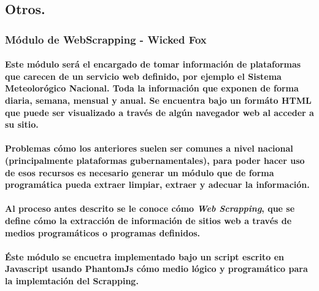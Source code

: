   \subsection{Otros.}
    \subsubsection{Módulo de WebScrapping - Wicked Fox}
    \paragraph{Este módulo será el encargado de tomar información de plataformas que carecen de un servicio web definido, por ejemplo el Sistema Meteolorógico Nacional. Toda la información que exponen de forma diaria, semana, mensual y anual. Se encuentra bajo un formáto HTML que puede ser visualizado a través de algún navegador web al acceder a su sitio.}
    \paragraph{Problemas cómo los anteriores suelen ser comunes a nivel nacional (principalmente plataformas gubernamentales), para poder hacer uso de esos recursos es necesario generar un módulo que de forma programática pueda extraer limpiar, extraer y adecuar la información.}
    \paragraph{Al proceso antes descrito se le conoce cómo \emph{Web Scrapping}\cite{6}, que se define cómo la extracción de información de sitios web a través de medios programáticos o programas definidos.}
    \paragraph{Éste módulo se encuetra implementado bajo un script escrito en Javascript usando PhantomJs cómo medio lógico y programático para la implemtación del Scrapping.}
